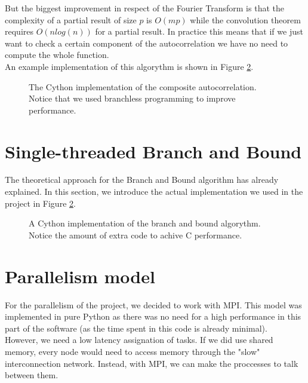       But the biggest improvement in respect of the Fourier Transform is that
      the complexity of a partial result of size $p$ is $O(mp)$ while the
      convolution theorem requires $O(nlog(n))$ for a partial result. In
      practice this means that if we just want to check a certain component
      of the autocorrelation we have no need to compute the whole function.\\

      An example implementation of this algorythm is shown in Figure \ref{composite_auto:fig:1}.

      \begin{figure}[ht!]
        \caption{The Cython implementation of the composite autocorrelation.
        Notice that we used branchless programming to improve performance.}
        \label{composite_auto:fig:1}
      \end{figure}

  \section{Single-threaded Branch and Bound}

  The theoretical approach for the Branch and Bound algorithm has already
  explained. In this section, we introduce the actual implementation we used
  in the project in Figure \ref{composite_auto:fig:1}.

  \begin{figure}[ht!]
    \caption{A Cython implementation of the branch and bound algorythm. Notice
    the amount of extra code to achive C performance.}
    \label{composite_auto:fig:1}
  \end{figure}


  \section{Parallelism model}

  For the parallelism of the project, we decided to work with MPI. This model
  was implemented in pure Python as there was no need for a high performance in
  this part of the software (as the time spent in this code is already
  minimal).\\

  However, we need a low latency assignation of tasks. If we did use shared
  memory, every node would need to access memory through the "slow"
  interconnection network. Instead, with MPI, we can make the proccesses to
  talk between them.\\

